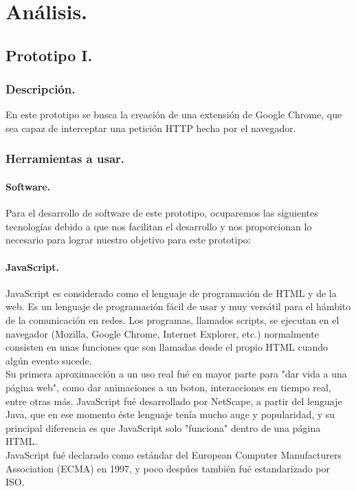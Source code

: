 \documentclass[12pt, a4paper, titlepage]{article}
\begin{document}
	\section{\textcolor{azulescom}{Análisis.}}
		\subsection{Prototipo I.}
			\subsubsection{Descripción.}
				En este prototipo se busca la creación de una extensión de Google Chrome, que sea capaz de interceptar una petición HTTP hecha por el navegador.
			\subsubsection{Herramientas a usar.}
				\paragraph{Software. \\}
				Para el desarrollo de software de este prototipo, ocuparemos las siguientes tecnologías debido a que nos facilitan el desarrollo y nos proporcionan lo necesario para lograr nuestro objetivo para este prototipo: 
				\paragraph {JavaScript. \\}
				JavaScript es considerado como el lenguaje de programación de HTML y de la web. Es un lenguaje de programación fácil de usar y muy versátil para el hámbito de la comunicación en redes. Los programas, llamados scripts, se ejecutan en el navegador (Mozilla, Google Chrome, Internet Explorer, etc.) normalmente consisten en unas funciones que son llamadas desde el propio HTML cuando algún evento sucede.\\ 
				Su primera aproximacción a un uso real fué en mayor parte para "dar vida a una página web", como dar animaciones a un boton, interacciones en tiempo real, entre otras más. 
				JavaScript fué desarrollado por NetScape, a partir del lenguaje Java, que en ese momento éste lenguaje tenía mucho auge y popularidad, y su principal diferencia es que JavaScript solo "funciona" dentro de una página HTML.\\
				JavaScript fué declarado como estándar del European Computer Manufacturers Association (ECMA) en 1997, y poco despúes también  fué estandarizado por ISO.\cite{refJavaScript} \\ 
				
\end{document}
